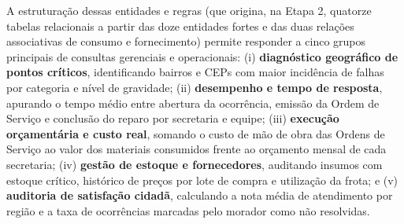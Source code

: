 A estruturação dessas entidades e regras (que origina, na Etapa 2, quatorze tabelas relacionais a partir das doze entidades fortes e das duas relações associativas de consumo e fornecimento) permite responder a cinco grupos principais de consultas gerenciais e operacionais: (i) \textbf{diagnóstico geográfico de pontos críticos}, identificando bairros e CEPs com maior incidência de falhas por categoria e nível de gravidade; (ii) \textbf{desempenho e tempo de resposta}, apurando o tempo médio entre abertura da ocorrência, emissão da Ordem de Serviço e conclusão do reparo por secretaria e equipe; (iii) \textbf{execução orçamentária e custo real}, somando o custo de mão de obra das Ordens de Serviço ao valor dos materiais consumidos frente ao orçamento mensal de cada secretaria; (iv) \textbf{gestão de estoque e fornecedores}, auditando insumos com estoque crítico, histórico de preços por lote de compra e utilização da frota; e (v) \textbf{auditoria de satisfação cidadã}, calculando a nota média de atendimento por região e a taxa de ocorrências marcadas pelo morador como não resolvidas.
